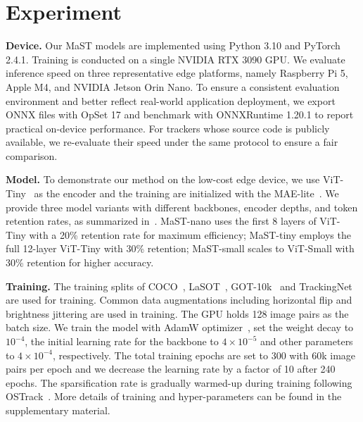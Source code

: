 \section{Experiment}
\label{Experiment}




\textbf{Device.} 
Our MaST models are implemented using Python 3.10 and PyTorch 2.4.1. Training is conducted on a single NVIDIA RTX 3090 GPU. We evaluate inference speed on three representative edge platforms, namely Raspberry Pi 5, Apple M4, and NVIDIA Jetson Orin Nano. 
To ensure a consistent evaluation environment and better reflect real-world application deployment, we export ONNX files with OpSet 17 and benchmark with ONNXRuntime 1.20.1 to report practical on-device performance. For trackers whose source code is publicly available, we re-evaluate their speed under the same protocol to ensure a fair comparison.



\textbf{Model.} 
To demonstrate our method on the low-cost edge device, we use ViT-Tiny~\cite{vit} as the encoder and the training are initialized with the MAE-lite~\cite{wang2023maelite}.
We provide three model variants with different backbones, encoder depths, and token retention rates, as summarized in~.
MaST-nano uses the first 8 layers of ViT-Tiny with a 20\% retention rate for maximum efficiency; MaST-tiny employs the full 12-layer ViT-Tiny with 30\% retention; MaST-small scales to ViT-Small with 30\% retention for higher accuracy.


\textbf{Training.} 
The training splits of COCO~\cite{coco}, LaSOT~\cite{lasot}, GOT-10k~\cite{got10k} and TrackingNet~\cite{trackingnet} are used for training. Common data augmentations including horizontal flip and brightness jittering are used in training. The GPU holds 128 image pairs as the batch size. We train the model with AdamW optimizer~\cite{adamw}, set the weight decay to $10^{-4}$, the initial learning rate for the backbone to $4\times10^{-5}$ and other parameters to $4\times10^{-4}$, respectively. The total training epochs are set to 300 with 60k image pairs per epoch and we decrease the learning rate by a factor of 10 after 240 epochs.  The sparsification rate is gradually warmed-up during training following OSTrack~\cite{ostrack}.  More details of training and hyper-parameters can be found in the supplementary material.



\begin{table}[t]
  \centering
  \begin{minipage}[t]{0.615\textwidth}
    
  \end{minipage}
  \hfill
  \begin{minipage}[t]{0.365\textwidth}
    
  \end{minipage}
\end{table}
